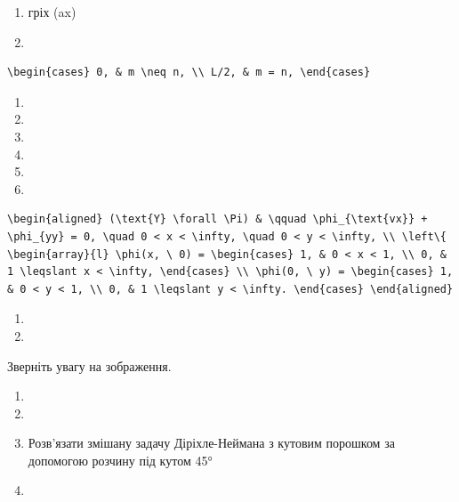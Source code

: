 \documentclass[
  ukrainian,
]{article}
\providecommand{\tightlist}{%
  \setlength{\itemsep}{0pt}\setlength{\parskip}{0pt}}
\begin{document}
\begin{enumerate}
\def\labelenumi{\arabic{enumi}.}
\setcounter{enumi}{19}
\item
  гріх (ax)
\item
\end{enumerate}

\begin{verbatim}
\begin{cases} 0, & m \neq n, \\ L/2, & m = n, \end{cases}
\end{verbatim}

\begin{enumerate}
\def\labelenumi{\arabic{enumi}.}
\setcounter{enumi}{10}
\tightlist
\item
\item
\item
\item
\item
\item
\end{enumerate}

\begin{verbatim}
\begin{aligned} (\text{Y} \forall \Pi) & \qquad \phi_{\text{vx}} + \phi_{yy} = 0, \quad 0 < x < \infty, \quad 0 < y < \infty, \\ \left\{ \begin{array}{l} \phi(x, \ 0) = \begin{cases} 1, & 0 < x < 1, \\ 0, & 1 \leqslant x < \infty, \end{cases} \\ \phi(0, \ y) = \begin{cases} 1, & 0 < y < 1, \\ 0, & 1 \leqslant y < \infty. \end{cases} \end{aligned}
\end{verbatim}

\begin{enumerate}
\def\labelenumi{\arabic{enumi}.}
\setcounter{enumi}{16}
\tightlist
\item
\item
\end{enumerate}

Зверніть увагу на зображення.

\begin{enumerate}
\def\labelenumi{\arabic{enumi}.}
\setcounter{enumi}{18}
\item
\item
\item
  Розв'язати змішану задачу Діріхле-Неймана з кутовим порошком за
  допомогою розчину під кутом 45°
\item
\end{enumerate}
\end{document}
